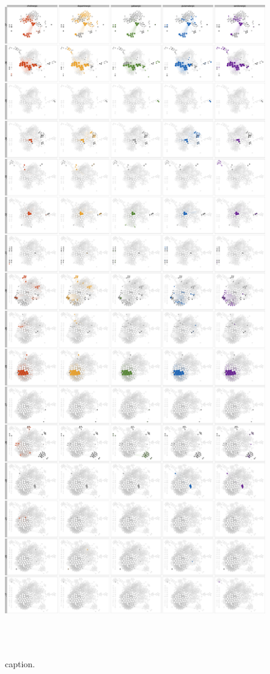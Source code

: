 \clearpage

\thispagestyle{empty}

\pdfpagewidth=16.6in \pdfpageheight=37.6in

\begin{figure}[p]

\caption{caption.}\label{fig:analysis.network.faceted_systems-1}

{\centering \includegraphics[height=35in, width=15in]{figs/analysis.network.faceted_systems-1} }

\end{figure}

